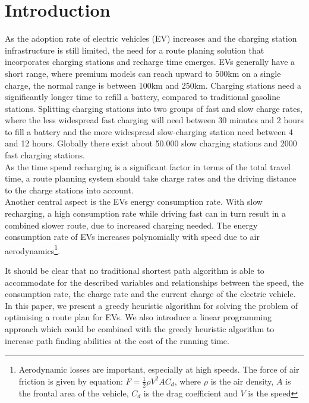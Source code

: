 \section{Introduction}

As the adoption rate of electric vehicles (EV) increases \cite{Henry2013} and the charging station infrastructure is still limited, the need for a route planing solution that incorporates charging stations and recharge time emerges. EVs generally have a short range, where premium models can reach upward to 500km on a single charge, the normal range is between 100km and 250km. Charging stations need a significantly longer time to refill a battery, compared to traditional gasoline stations. Splitting charging stations into two groups of fast and slow charge rates, where the less widespread fast charging will need between 30 minutes and 2 hours to fill a battery and the more widespread slow-charging station need between 4 and 12 hours. Globally there exist about 50.000 slow charging stations and 2000 fast charging stations\cite{Globalevoutlook}.\\
As the time spend recharging is a significant factor in terms of the total travel time, a route planning system should take charge rates and the driving distance to the charge stations into account.\\
Another central aspect is the EVs energy consumption rate. With slow recharging, a high consumption rate while driving fast can in turn result in a combined slower route, due to increased charging needed. The energy consumption rate of EVs increases polynomially with speed due to air aerodynamics\footnote{Aerodynamic losses are important, especially at high speeds. The force of air friction is given by equation: $F = \frac{1}{2} \rho V^2 A C_d$, where $\rho$ is the air density, $A$ is the frontal area of the vehicle, $C_d$ is the drag coefficient and $V$ is the speed}.

It should be clear that no traditional shortest path algorithm is able to accommodate for the described variables and relationships between the speed, the consumption rate, the charge rate and the current charge of the electric vehicle. In this paper, we present a greedy heuristic algorithm for solving the problem of optimising a route plan for EVs.  We also introduce a linear programming approach which could be combined with the greedy heuristic algorithm to increase path finding abilities at the cost of the running time.  
